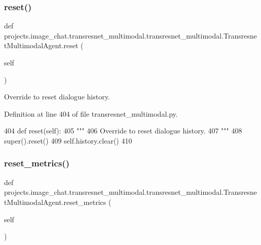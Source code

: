 \subsubsection{\texorpdfstring{reset()}{reset()}}
{\footnotesize\ttfamily def projects.\+image\+\_\+chat.\+transresnet\+\_\+multimodal.\+transresnet\+\_\+multimodal.\+Transresnet\+Multimodal\+Agent.\+reset (\begin{DoxyParamCaption}\item[{}]{self }\end{DoxyParamCaption})}

\begin{DoxyVerb}Override to reset dialogue history.
\end{DoxyVerb}
 

Definition at line 404 of file transresnet\+\_\+multimodal.\+py.


\begin{DoxyCode}
404     \textcolor{keyword}{def }reset(self):
405         \textcolor{stringliteral}{"""}
406 \textcolor{stringliteral}{        Override to reset dialogue history.}
407 \textcolor{stringliteral}{        """}
408         super().reset()
409         self.history.clear()
410 
\end{DoxyCode}
\mbox{\label{classprojects_1_1image__chat_1_1transresnet__multimodal_1_1transresnet__multimodal_1_1TransresnetMultimodalAgent_a3637844305cec03781959fedcbf11457}} 
\subsubsection{\texorpdfstring{reset\+\_\+metrics()}{reset\_metrics()}}
{\footnotesize\ttfamily def projects.\+image\+\_\+chat.\+transresnet\+\_\+multimodal.\+transresnet\+\_\+multimodal.\+Transresnet\+Multimodal\+Agent.\+reset\+\_\+metrics (\begin{DoxyParamCaption}\item[{}]{self }\end{DoxyParamCaption})}

